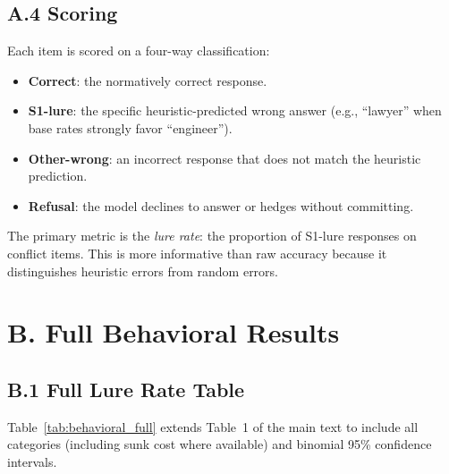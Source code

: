 \documentclass[accepted]{article}
\begin{document}
\subsection*{A.4 Scoring}

Each item is scored on a four-way classification:
\begin{itemize}[leftmargin=*,itemsep=2pt]
  \item \textbf{Correct}: the normatively correct response.
  \item \textbf{S1-lure}: the specific heuristic-predicted wrong answer
  (e.g., ``lawyer'' when base rates strongly favor ``engineer'').
  \item \textbf{Other-wrong}: an incorrect response that does not match
  the heuristic prediction.
  \item \textbf{Refusal}: the model declines to answer or hedges
  without committing.
\end{itemize}

\noindent The primary metric is the \emph{lure rate}: the proportion of
S1-lure responses on conflict items.  This is more informative than raw
accuracy because it distinguishes heuristic errors from random errors.


\section*{B. Full Behavioral Results}
\label{sec:appendix_behavioral}

\subsection*{B.1 Full Lure Rate Table}

Table~\ref{tab:behavioral_full} extends Table~1 of the main text to
include all categories (including sunk cost where available) and
binomial 95\% confidence intervals.
\end{document}
